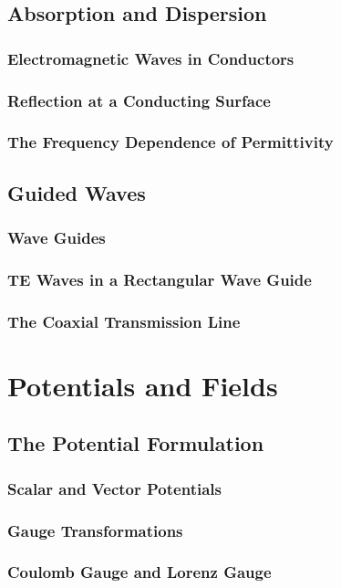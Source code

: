 \documentclass[11pt,a4paper]{article}
\begin{document}
\subsection{Absorption and Dispersion}
\subsubsection{Electromagnetic Waves in Conductors}
\subsubsection{Reflection at a Conducting Surface}
\subsubsection{The Frequency Dependence of Permittivity}
\subsection{Guided Waves}
\subsubsection{Wave Guides}
\subsubsection{TE Waves in a Rectangular Wave Guide}
\subsubsection{The Coaxial Transmission Line}
\section{Potentials and Fields}
\subsection{The Potential Formulation}
\subsubsection{Scalar and Vector Potentials}
\subsubsection{Gauge Transformations}
\subsubsection{Coulomb Gauge and Lorenz Gauge}
\end{document}
